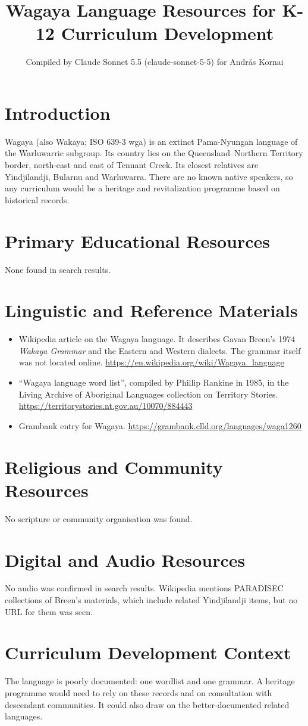 \documentclass[12pt]{article}
\title{Wagaya Language Resources for K-12 Curriculum Development}
\author{Compiled by Claude Sonnet 5.5 (claude-sonnet-5-5) for Andr\'as Kornai}
\date{}
\begin{document}
\maketitle

\section{Introduction}
Wagaya (also Wakaya; ISO 639-3 wga) is an extinct Pama-Nyungan language of the Warluwarric subgroup. Its country lies on the Queensland--Northern Territory border, north-east and east of Tennant Creek. Its closest relatives are Yindjilandji, Bularnu and Warluwarra. There are no known native speakers, so any curriculum would be a heritage and revitalization programme based on historical records.

\section{Primary Educational Resources}
None found in search results.

\section{Linguistic and Reference Materials}
\begin{itemize}
\item Wikipedia article on the Wagaya language. It describes Gavan Breen's 1974 \emph{Wakaya Grammar} and the Eastern and Western dialects. The grammar itself was not located online. \url{https://en.wikipedia.org/wiki/Wagaya_language}
\item ``Wagaya language word list'', compiled by Phillip Rankine in 1985, in the Living Archive of Aboriginal Languages collection on Territory Stories. \url{https://territorystories.nt.gov.au/10070/884443}
\item Grambank entry for Wagaya. \url{https://grambank.clld.org/languages/waga1260}
\end{itemize}

\section{Religious and Community Resources}
No scripture or community organisation was found.

\section{Digital and Audio Resources}
No audio was confirmed in search results. Wikipedia mentions PARADISEC collections of Breen's materials, which include related Yindjilandji items, but no URL for them was seen.

\section{Curriculum Development Context}
The language is poorly documented: one wordlist and one grammar. A heritage programme would need to rely on these records and on consultation with descendant communities. It could also draw on the better-documented related languages.
\end{document}

